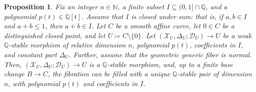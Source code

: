 \documentclass{amsart}
\newcommand{\bQ}{\mathbb{Q}}
\newcommand{\cD}{\mathcal{D}}
\newcommand{\cX}{\mathcal{X}}
\newtheorem{Prop}[theorem]{Proposition}
\theoremstyle{definition}
\newcommand{\rar}{\rightarrow}
\begin{document}
\begin{Prop} \label{properness_lc_case}
Fix an integer $n\in \mathbb{N}$, a finite subset $I\subseteq (0,1] \cap \mathbb{Q}$, and a polynomial $p(t) \in \mathbb{Q}[t]$.
Assume that $I$ is closed under sum: that is, if $a,b \in I$ and $a+b \leq 1$, then $a+b \in I$.
Let $C$ be a smooth affine curve, let $0 \in C$ be a distinguished closed point, and let $U\coloneqq C \setminus \{ 0 \}$.
Let $(\cX_U, \Delta_U; \cD_U) \rightarrow U$ be a weak $\bQ$-stable morphism of relative dimension $n$, polynomial $p(t)$, coefficients in $I$, and constant part $\Delta_U$.
Further, assume that the geometric generic fiber is normal.
Then, $(\cX_U, \Delta_U; \cD_U) \rightarrow U$ is a $\bQ$-stable morphism, and, up to a finite base change $B \rar C$, the fibration can be filled with a unique $\bQ$-stable pair of dimension $n$, with polynomial $p(t)$ and coefficients in $I$.
\end{Prop}
\end{document}
